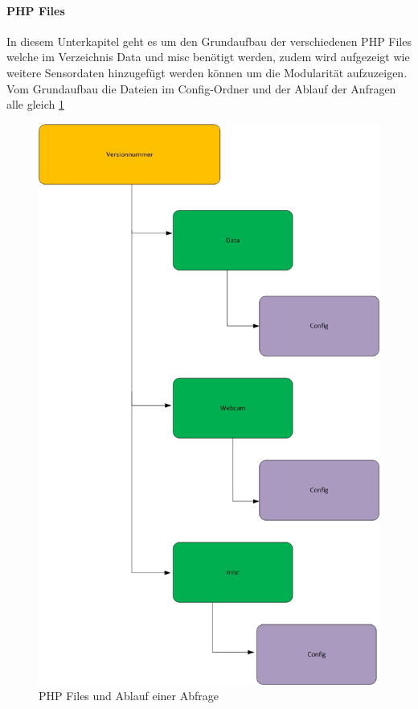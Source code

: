 \paragraph{PHP Files}
In diesem Unterkapitel geht es um den Grundaufbau der verschiedenen PHP Files welche im Verzeichnis Data und misc benötigt werden, zudem wird aufgezeigt wie weitere Sensordaten hinzugefügt werden können um die Modularität aufzuzeigen. Vom Grundaufbau die Dateien im Config-Ordner und der Ablauf der Anfragen alle gleich \ref{img:APIFiles}
\begin{figure}[h!]
	\centering
	\includegraphics[width=1\linewidth]{img/APIFiles.jpg}
	\caption{PHP Files und Ablauf einer Abfrage}
	\label{img:APIFiles}
\end{figure}


